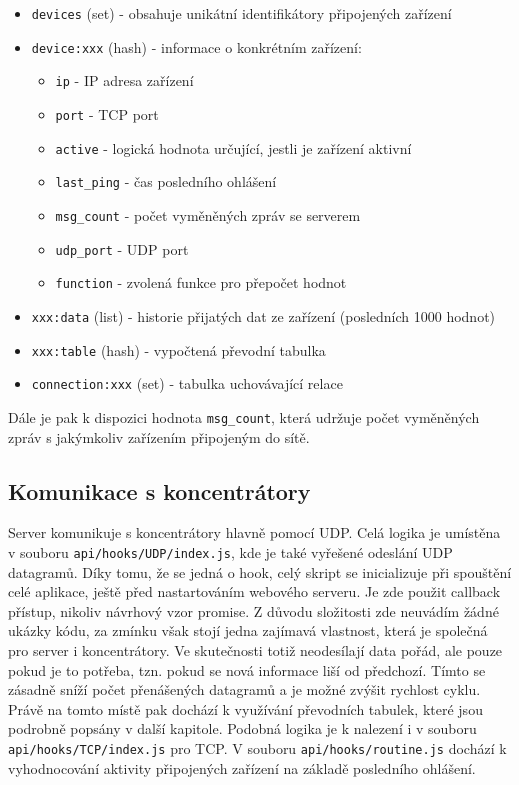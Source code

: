 \begin{itemize}
\itemsep0em
\item \texttt{devices} (set) - obsahuje unikátní identifikátory připojených zařízení
\item \texttt{device:xxx} (hash) - informace o konkrétním zařízení:
	\begin{itemize}
	\itemsep0em
		\item \texttt{ip} - IP adresa zařízení
		\item \texttt{port} - TCP port
		\item \texttt{active} - logická hodnota určující, jestli je zařízení aktivní
		\item \texttt{last\_ping} - čas posledního ohlášení
		\item \texttt{msg\_count} - počet vyměněných zpráv se serverem
		\item \texttt{udp\_port} - UDP port
		\item \texttt{function} - zvolená funkce pro přepočet hodnot
	\end{itemize}
\item \texttt{xxx:data} (list) - historie přijatých dat ze zařízení (posledních 1000 hodnot)
\item \texttt{xxx:table} (hash) - vypočtená převodní tabulka
\item \texttt{connection:xxx} (set) - tabulka uchovávající relace
\end{itemize}

Dále je pak k dispozici hodnota \texttt{msg\_count}, která udržuje počet vy\-mě\-ně\-ných zpráv s jakýmkoliv zařízením připojeným do sítě.

\subsection{Komunikace s koncentrátory}
Server komunikuje s koncentrátory hlavně pomocí UDP. Celá logika je u\-mís\-tě\-na v souboru \texttt{api/hooks/UDP/index.js}, kde je také vyřešené odeslání UDP datagramů. Díky tomu, že se jedná o hook, celý skript se inicializuje při spouštění celé aplikace, ještě před nastartováním webového serveru. Je zde použit callback přístup, nikoliv návrhový vzor promise. Z důvodu složitosti zde neuvádím žádné ukázky kódu, za zmínku však stojí jedna zajímavá vlastnost, která je společná pro server i koncentrátory. Ve skutečnosti totiž neodesílají data pořád, ale pouze pokud je to potřeba, tzn. pokud se nová informace liší od předchozí. Tímto se zásadně sníží počet přenášených datagramů a je možné zvýšit rychlost cyklu. Právě na tomto místě pak dochází k využívání převodních tabulek, které jsou podrobně popsány v další kapitole. Podobná logika je k nalezení i v souboru \texttt{api/hooks/TCP/index.js} pro TCP. V souboru \texttt{api/hooks/routine.js} dochází k vyhodnocování aktivity připojených zařízení na základě posledního ohlášení.

